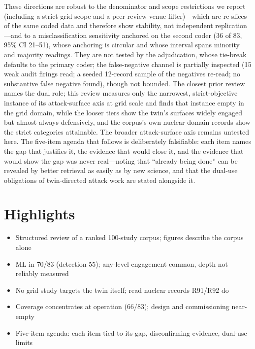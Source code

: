 \documentclass[preprint,12pt]{elsarticle}
\renewcommand{\_}{\plainunderscore\allowbreak}
\begin{document}
These directions are robust to the denominator and scope restrictions we report (including a
strict grid scope and a peer-review venue filter)---which are re-slices of the same coded
data and therefore show stability, not independent replication---and to a misclassification
sensitivity anchored on the second coder (36 of 83, 95\% CI 21--51), whose anchoring is
circular and whose interval spans minority and majority readings. They are not tested by
the adjudication, whose tie-break defaults to the primary coder; the false-negative
channel is partially inspected (15 weak audit firings read; a seeded 12-record sample
of the negatives re-read; no substantive false negative found), though not bounded.
The closest prior
review names the dual role; this review measures only the narrowest, strict-objective instance
of its attack-surface axis at grid scale and finds that instance empty in the grid domain,
while the looser tiers
show the twin's surfaces widely engaged but almost always defensively, and the corpus's own
nuclear-domain records show the strict categories attainable. The broader attack-surface
axis remains untested here. The five-item agenda that follows is deliberately falsifiable:
each item names the gap that justifies it, the evidence that would close it, and the
evidence that would show the gap was never real---noting that ``already being done'' can be
revealed by better retrieval as easily as by new science, and that the dual-use obligations
of twin-directed attack work are stated alongside it.

\section*{Highlights}
\begin{itemize}
  \item Structured review of a ranked 100-study corpus; figures describe the corpus alone
  \item ML in 70/83 (detection 55); any-level engagement common, depth not reliably measured
  \item No grid study targets the twin itself; read nuclear records R91/R92 do
  \item Coverage concentrates at operation (66/83); design and commissioning near-empty
  \item Five-item agenda: each item tied to its gap, disconfirming evidence, dual-use limits
\end{itemize}
\end{document}
